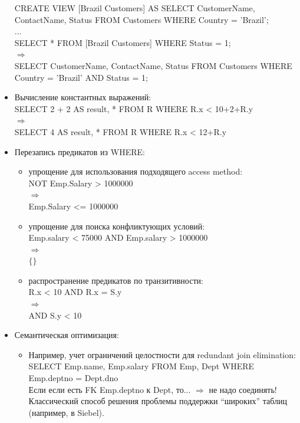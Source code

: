 \documentclass{beamer}
\begin{document}
\begin{frame}[allowframebreaks]
\begin{itemize}
CREATE VIEW [Brazil Customers] AS SELECT CustomerName, ContactName, Status FROM Customers WHERE Country = 'Brazil';\\
...\\
SELECT * FROM [Brazil Customers] WHERE Status = 1;\\
$\Longrightarrow$\\
SELECT CustomerName, ContactName, Status FROM Customers WHERE Country = 'Brazil' AND Status = 1; 	
  \item Вычисление константных выражений:\\
SELECT 2 + 2 AS result, * FROM R WHERE R.x < 10+2+R.y\\
$\Longrightarrow$\\
SELECT 4 AS result, * FROM R WHERE R.x < 12+R.y
  \item Перезапись предикатов из WHERE:
  \begin{itemize}
    \setlength\itemsep{1em}
    \item упрощение для использования подходящего access method:\\
    NOT Emp.Salary > 1000000\\
    $\Longrightarrow$\\
    Emp.Salary <= 1000000
    \item упрощение для поиска конфликтующих условий:\\
    Emp.salary < 75000 AND Emp.salary > 1000000\\
    $\Longrightarrow$\\
    $\{\}$
    \item распространение предикатов по транзитивности:\\
    R.x < 10 AND R.x = S.y\\
    $\Longrightarrow$\\
    AND S.y < 10
  \end{itemize}
  \item Семантическая оптимизация:
  \begin{itemize}
  \setlength\itemsep{1em}
    \item Например, учет ограничений целостности для redundant join elimination:\\   
    SELECT Emp.name, Emp.salary FROM Emp, Dept WHERE Emp.deptno = Dept.dno\\
    Если если есть FK Emp.deptno к Dept, то...
    $\Longrightarrow$ \alert{не надо соединять!}
    Классический способ решения проблемы поддержки ``широких'' таблиц (например, в Siebel).
  \end{itemize}
  \framebreak
  

\end{itemize}
\end{frame}
\end{document}
